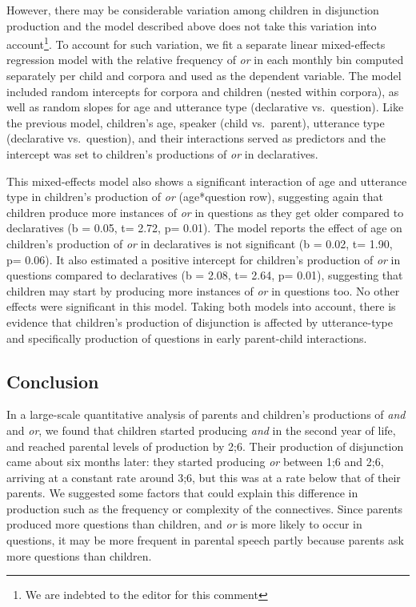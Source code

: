 \documentclass[
  ,man,floatsintext]{apa6}
\begin{document}
However, there may be considerable variation among children in disjunction production and the model described above does not take this variation into account\footnote{We are indebted to the editor for this comment}. To account for such variation, we fit a separate linear mixed-effects regression model with the relative frequency of \emph{or} in each monthly bin computed separately per child and corpora and used as the dependent variable. The model included random intercepts for corpora and children (nested within corpora), as well as random slopes for age and utterance type (declarative vs.~question). Like the previous model, children's age, speaker (child vs.~parent), utterance type (declarative vs.~question), and their interactions served as predictors and the intercept was set to children's productions of \emph{or} in declaratives.

This mixed-effects model also shows a significant interaction of age and utterance type in children's production of \emph{or} (age*question row), suggesting again that children produce more instances of \emph{or} in questions as they get older compared to declaratives (b = 0.05, t= 2.72, p= 0.01). The model reports the effect of age on children's production of \emph{or} in declaratives is not significant (b = 0.02, t= 1.90, p= 0.06). It also estimated a positive intercept for children's production of \emph{or} in questions compared to declaratives (b = 2.08, t= 2.64, p= 0.01), suggesting that children may start by producing more instances of \emph{or} in questions too. No other effects were significant in this model. Taking both models into account, there is evidence that children's production of disjunction is affected by utterance-type and specifically production of questions in early parent-child interactions.

\hypertarget{study1discussion}{%
\subsection{Conclusion}\label{study1discussion}}

In a large-scale quantitative analysis of parents and children's productions of \emph{and} and \emph{or}, we found that children started producing \emph{and} in the second year of life, and reached parental levels of production by 2;6. Their production of disjunction came about six months later: they started producing \emph{or} between 1;6 and 2;6, arriving at a constant rate around 3;6, but this was at a rate below that of their parents. We suggested some factors that could explain this difference in production such as the frequency or complexity of the connectives. Since parents produced more questions than children, and \emph{or} is more likely to occur in questions, it may be more frequent in parental speech partly because parents ask more questions than children.
\end{document}
